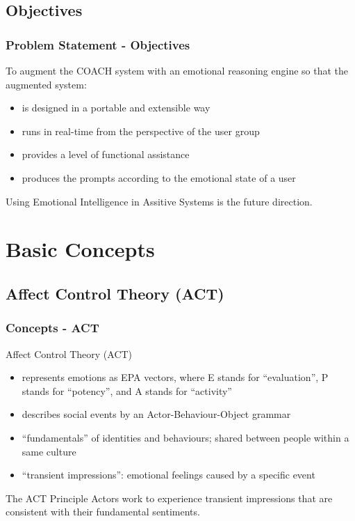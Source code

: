 \documentclass{beamer}
\begin{document}
\subsection{Objectives}
\begin{frame}
\frametitle{Problem Statement - Objectives}
To augment the COACH system with an emotional reasoning engine so that the augmented system:\\
\begin{itemize}
\item is designed in a portable and extensible way
\item runs in real-time from the perspective of the user group
\item provides a level of functional assistance
\item produces the prompts according to the emotional state of a user
\end{itemize}
\vspace{.5cm}
Using Emotional Intelligence in Assitive Systems is the future direction.
\end{frame}

\section{Basic Concepts}
\subsection{Affect Control Theory (ACT)}
\begin{frame}
\frametitle{Concepts - ACT}
Affect Control Theory (ACT)
\begin{itemize}
\item represents emotions as EPA vectors, where E stands for ``evaluation'', P stands for ``potency'',
and A stands for ``activity''
\item describes social events by an Actor-Behaviour-Object grammar
\item ``fundamentals'' of identities and behaviours; shared between people within a same culture
\item ``transient impressions'': emotional feelings caused by a specific event
\end{itemize}
\pause
\begin{block}{The ACT Principle}
Actors work to experience transient impressions that are consistent with their fundamental sentiments.
\end{block}
\end{frame}
\end{document}
